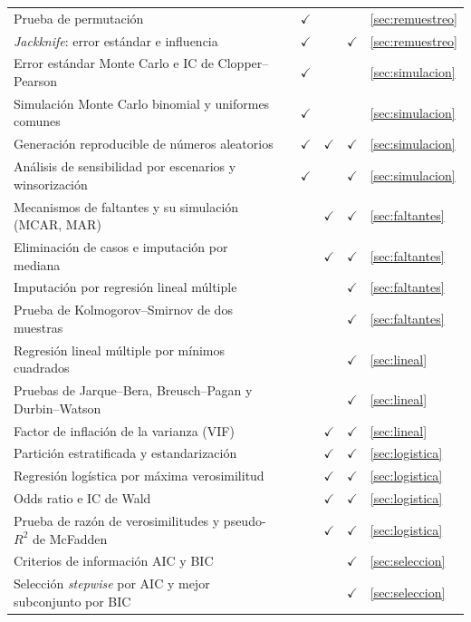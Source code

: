 \documentclass[11pt,a4paper]{article}
\begin{document}
{\begin{longtable}{@{}p{7.3cm} c c c c p{3.6cm}@{}}
Prueba de permutación & & $\checkmark$ & & & \ref{sec:remuestreo}\\
\emph{Jackknife}: error estándar e influencia & & $\checkmark$ & & $\checkmark$ & \ref{sec:remuestreo}\\
Error estándar Monte Carlo e IC de Clopper--Pearson & & $\checkmark$ & & & \ref{sec:simulacion}\\
Simulación Monte Carlo binomial y uniformes comunes & & $\checkmark$ & & & \ref{sec:simulacion}\\
Generación reproducible de números aleatorios & & $\checkmark$ & $\checkmark$ & $\checkmark$ & \ref{sec:simulacion}\\
Análisis de sensibilidad por escenarios y winsorización & & $\checkmark$ & & $\checkmark$ & \ref{sec:simulacion}\\
Mecanismos de faltantes y su simulación (MCAR, MAR) & & & $\checkmark$ & $\checkmark$ & \ref{sec:faltantes}\\
Eliminación de casos e imputación por mediana & & & $\checkmark$ & $\checkmark$ & \ref{sec:faltantes}\\
Imputación por regresión lineal múltiple & & & & $\checkmark$ & \ref{sec:faltantes}\\
Prueba de Kolmogorov--Smirnov de dos muestras & & & & $\checkmark$ & \ref{sec:faltantes}\\
Regresión lineal múltiple por mínimos cuadrados & & & & $\checkmark$ & \ref{sec:lineal}\\
Pruebas de Jarque--Bera, Breusch--Pagan y Durbin--Watson & & & & $\checkmark$ & \ref{sec:lineal}\\
Factor de inflación de la varianza (VIF) & & & $\checkmark$ & $\checkmark$ & \ref{sec:lineal}\\
Partición estratificada y estandarización & & & $\checkmark$ & $\checkmark$ & \ref{sec:logistica}\\
Regresión logística por máxima verosimilitud & & & $\checkmark$ & $\checkmark$ & \ref{sec:logistica}\\
Odds ratio e IC de Wald & & & $\checkmark$ & $\checkmark$ & \ref{sec:logistica}\\
Prueba de razón de verosimilitudes y pseudo-$R^2$ de McFadden & & & $\checkmark$ & $\checkmark$ & \ref{sec:logistica}\\
Criterios de información AIC y BIC & & & & $\checkmark$ & \ref{sec:seleccion}\\
Selección \emph{stepwise} por AIC y mejor subconjunto por BIC & & & & $\checkmark$ & \ref{sec:seleccion}\\

\end{longtable}}
\end{document}
